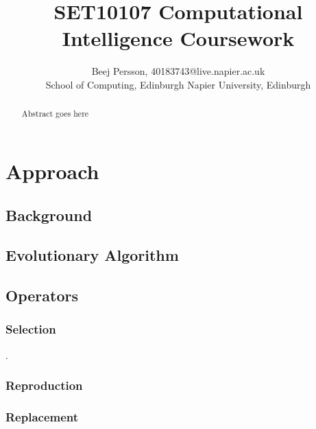 \documentclass[sigconf]{acmart}
\begin{document}
\title{SET10107 Computational Intelligence Coursework}

\author{Beej Persson, 40183743@live.napier.ac.uk\\School of Computing, Edinburgh Napier University, Edinburgh}



\begin{abstract}
Abstract goes here
\end{abstract}





\maketitle

\section{Approach}
\subsection{Background}
\cite{back96}
\subsection{Evolutionary Algorithm}
\subsection{Operators}
\subsubsection{Selection}
\cite{blickle96}. \cite{goldberg91}
\subsubsection{Reproduction}
\subsubsection{Replacement}
\end{document}
